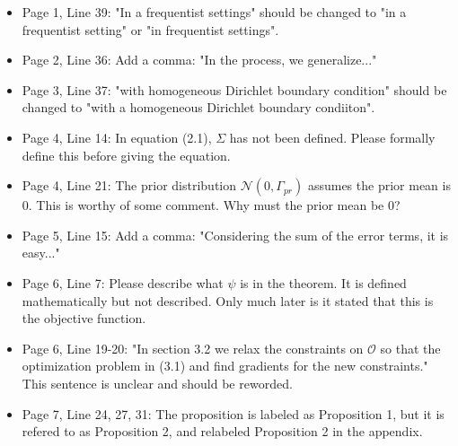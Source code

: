\documentclass{amsart}
\begin{document}
\begin{itemize}
\item Page 1, Line 39: "In a frequentist settings" should be changed
  to "in a frequentist setting" or "in frequentist
  settings".

\item Page 2, Line 36: Add a comma: "In the process, we generalize..."
  
\item Page 3, Line 37: "with homogeneous Dirichlet boundary condition"
  should be changed to "with a homogeneous Dirichlet boundary
  condiiton". 

\item Page 4, Line 14: In equation (2.1), $\Sigma$ has not been
  defined. Please formally define this before giving the equation.

\item Page 4, Line 21: The prior distribution $\mathcal{N}(0,
  \Gamma_{pr})$ assumes the prior mean is 0. This is worthy of some
  comment. Why must the prior mean be 0?

\item Page 5, Line 15: Add a comma: "Considering the sum of the error
  terms, it is easy..."

  
\item Page 6, Line 7: Please describe what $\psi$ is in the
  theorem. It is defined mathematically but not described. Only much
  later is it stated that this is the objective
  function.

\item Page 6, Line 19-20: "In section 3.2 we relax the constraints on
  $\mathcal{O}$ so that the optimization problem in (3.1) and find
  gradients for the new constraints." This sentence is unclear and
  should be reworded.

\item Page 7, Line 24, 27, 31: The proposition is labeled as
  Proposition 1, but it is refered to as Proposition 2, and relabeled
  Proposition 2 in the appendix.


\end{itemize}
\end{document}
